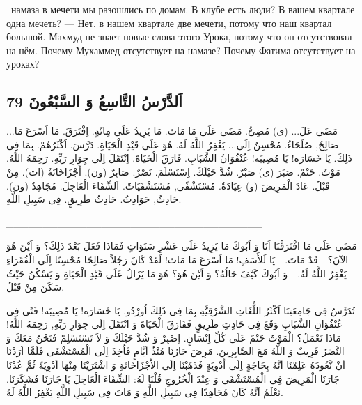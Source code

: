 \documentclass[a5paper]{article}
\begin{document}
\ намаза в мечети мы разошлись по домам. В клубе есть люди? В вашем квартале одна мечеть? — Нет, в нашем квартале две мечети, потому что наш квартал большой. Махмуд не знает новые слова этого Урока, потому что он отсутствовал на нём. Почему Мухаммед отсутствует на намазе? Почему Фатима отсутствует на уроках?

\subsection{اَلدَّرْسُ التَّاسِعُ وَ السَّبْعُونَ 79}
مَضَى عَلَ... (ى) مُضِىٌّ. مَضَى عَلَى مَا مَاتَ. مَا يَزِيدُ عَلَى مِائَةٍ. اِفْتَرَقَ. مَا اَسْرَعَ مَا... صَالِحٌ, صُلَحَاءُ. مُحْسِنٌ اِلَى... يَغْفِرُ اللَّهُ لَهُ. هُوَ عَلَى قَيْدِ الْحَيَاةِ. دَرَّسَ. اَكْثَرُهُمْ. بِمَا فِى ذَلِكَ. يَا خَسَارَه! يَا مُصِيبَه! عُنْفُوَانُ الشَّبَابِ. فَارَقَ الْحَيَاةَ. اِنْتَقَلَ اِلَى جِوَارِ رَبِّهِ. رَحِمَهُ اللَّهُ. مَوْتٌ. حَتْمٌ. صَبَرَ (ى) صَبْرٌ. شُدَّ حَيْلَكَ. اِسْتَسْلَمَ. نَصْرٌ. صَابِرٌ (ون). أَجْزَاخَانَةٌ (ات). مِنْ قَبْلُ. عَادَ الْمَرِيضَ (و) عِيَادَةٌ. مُسْتَشْفًى, مُسْتَشْفَيَاتٌ. اَلشِّفَاءَ الْعَاجِلَ. مُجَاهِدٌ (ون). حَادِثٌ, حَوَادِثُ. حَادِثُ طَرِيقٍ. فِى سَبِيلِ اللَّهِ.

\_\_\_\_\_\_\_\_\_\_\_\_\_\_\_\_\_\_\_\_\_\_\_\_\_\_\_\_\_\_\_\_\_\_\_

مَضَى عَلَى مَا افْتَرَقْنَا اَنَا وَ اَبُوكَ مَا يَزِيدُ عَلَى عَشْرِ سَنَوَاتٍ فَمَاذَا فَعَلَ بَعْدَ ذَلِكَ؟ وَ اَيْنَ هُوَ الآنَ؟ - قَدْ مَاتَ. - يَا لَلأَسَفِ! مَا اَسْرَعَ مَا مَاتَ! لَقَدْ كَانَ رَجُلاً صَالِحًا مُحْسِنًا اِلَى الْفُقَرَاءِ يَغْفِرُ اللَّهُ لَهُ. - وَ اَبُوكَ كَيْفَ حَالُهُ؟ وَ اَيْنَ هُوَ؟ هُوَ مَا يَزَالُ عَلَى قَيْدِ الْحَيَاةِ وَ يَسْكُنُ حَيْثُ سَكَنَ مِنْ قَبْلُ.

تُدَرَّسُ فِى جَامِعَتِنَا اَكْثَرُ اللُّغَاتِ الشَّرْقِيَّةِ بِمَا فِى ذَلِكَ اُورْدُو. يَا خَسَارَه! يَا مُصِيبَه! فَتًى فِى عُنْفُوَانِ الشَّبَابِ وَقَعَ فِى حَادِثِ طَرِيقٍ فَفَارَقَ الْحَيَاةَ وَ انْتَقَلَ اِلَى جِوَارِ رَبِّهِ, رَحِمَهُ اللَّهُ! مَاذَا نَعْمَلُ؟ الْمَوْتُ حَتْمٌ عَلَى كُلِّ اِنْسَانٍ. اِصْبِرْ وَ شُدَّ حَيْلَكَ وَ لاَ تَسْتَسْلِمْ فَنَحْنُ مَعَكَ وَ النَّصْرُ قَرِيبٌ وَ اللَّهُ مَعَ الصَّابِرِينَ. مَرِضَ جَارُنَا مُنْذُ اَيَّامٍ فَاُخِذَ اِلَى الْمُسْتَشْفَى فَلَمَّا اَرَدْنَا اَنْ نَّعُودَهُ عَلِمْنَا اَنَّهُ بِحَاجَةٍ اِلَى أَدْوِيَةٍ فَذَهَبْنَا اِلَى الأَجْزَاخَانَةِ وَ اشْتَرَيْنَا مِنْهَا اَدْوِيَةً ثُمَّ عُدْنَا جَارَنَا الْمَرِيضَ فِى الْمُسْتَشْفَى وَ عِنْدَ الْخُرُوجِ قُلْنَا لَهُ: الشِّفَاءَ الْعَاجِلَ يَا جَارَنَا فَشَكَرَنَا. نَعْلَمُ اَنَّهُ كَانَ مُجَاهِدًا فِى سَبِيلِ اللَّهِ وَ مَاتَ فِى سَبِيلِ اللَّهِ يَغْفِرُ اللَّهُ لَهُ.
\end{document}
